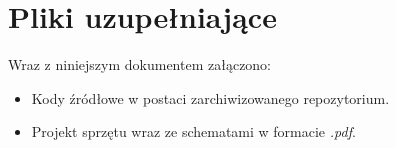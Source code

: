 \chapter{Pliki uzupełniające} 
Wraz z niniejszym dokumentem załączono:
\begin{itemize}
\item Kody źródłowe w postaci zarchiwizowanego repozytorium.
\item Projekt sprzętu wraz ze schematami w formacie \textit{.pdf}.
\end{itemize}

